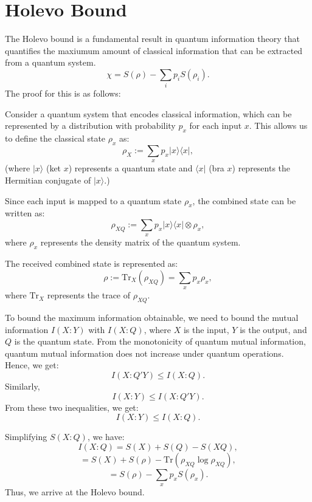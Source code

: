 \section{Holevo Bound}
The Holevo bound is a fundamental result in quantum information theory that quantifies the maxiumum amount of classical information that can be extracted from a quantum system.
\[
\chi = S(\rho) - \sum_i p_i S(\rho_i).
\]
The proof for this is as follows:

Consider a quantum system that encodes classical information, which can be represented by a distribution with probability $p_x$ for each input $x$. This allows us to define the classical state $\rho_x$ as:
\[
\rho_X := \sum_x p_x \lvert x \rangle \langle x \rvert,
\]
(where $\lvert x \rangle$ (ket $x$) represents a quantum state and $\langle x \rvert$ (bra $x$) represents the Hermitian conjugate of $\lvert x \rangle$.)

Since each input is mapped to a quantum state $\rho_x$, the combined state can be written as:
\[
\rho_{XQ} := \sum_x p_x \lvert x \rangle \langle x \rvert \otimes \rho_x,
\]
where $\rho_x$ represents the density matrix of the quantum system.

The received combined state is represented as:
\[
\rho := \text{Tr}_X (\rho_{XQ}) = \sum_x p_x \rho_x,
\]
where $\text{Tr}_X$ represents the trace of $\rho_{XQ}$.

To bound the maximum information obtainable, we need to bound the mutual information $I(X : Y)$ with $I(X : Q)$, where $X$ is the input, $Y$ is the output, and $Q$ is the quantum state. From the monotonicity of quantum mutual information, quantum mutual information does not increase under quantum operations. Hence, we get:
\[
I(X : Q'Y) \leq I(X : Q).
\]
Similarly,
\[
I(X : Y) \leq I(X : Q'Y).
\]
From these two inequalities, we get:
\[
I(X : Y) \leq I(X : Q).
\]

Simplifying $S(X : Q)$, we have:
\[
I(X : Q) = S(X) + S(Q) - S(XQ),
\]
\[
= S(X) + S(\rho) - \text{Tr}(\rho_{XQ} \log \rho_{XQ}),
\]
\[
= S(\rho) - \sum_x p_x S(\rho_x).
\]
Thus, we arrive at the Holevo bound.

